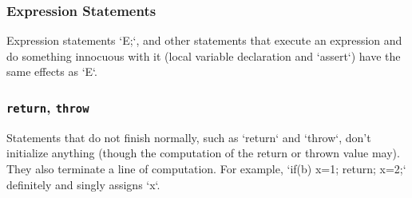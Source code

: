 \subsubsection{Expression Statements}

Expression statements \xcd`E;`, and other statements that execute an
expression and do something innocuous with it (local variable declaration and
\xcd`assert`) have the same effects as \xcd`E`. 

\subsubsection{{\tt return}, {\tt throw}}

Statements that do not finish normally, such as \xcd`return` and \xcd`throw`,
don't initialize anything (though the computation of the return or thrown
value may).    They also terminate a line of computation.  For example, 
\xcd`if(b) {x=1; return;}  x=2;` definitely and singly assigns \xcd`x`.  
